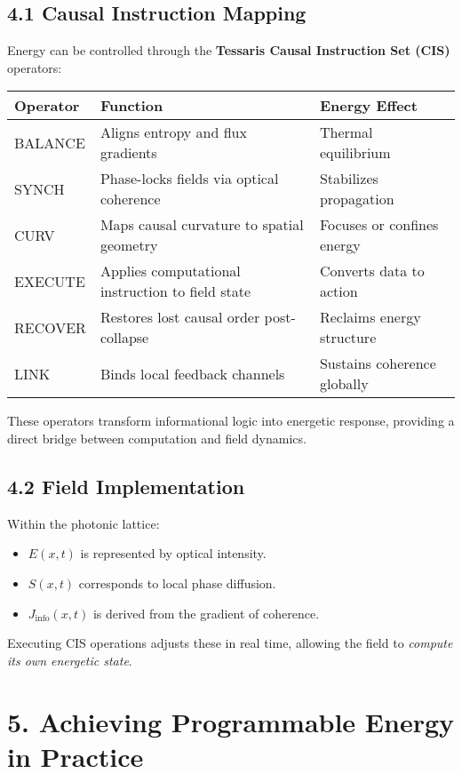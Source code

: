 \documentclass[11pt,a4paper]{article}
\begin{document}
\subsection*{4.1 Causal Instruction Mapping}
Energy can be controlled through the \textbf{Tessaris Causal Instruction Set (CIS)} operators:
\begin{center}
\begin{tabular}{|l|l|l|}
\hline
\textbf{Operator} & \textbf{Function} & \textbf{Energy Effect} \\
\hline
BALANCE & Aligns entropy and flux gradients & Thermal equilibrium \\
SYNCH & Phase-locks fields via optical coherence & Stabilizes propagation \\
CURV & Maps causal curvature to spatial geometry & Focuses or confines energy \\
EXECUTE & Applies computational instruction to field state & Converts data to action \\
RECOVER & Restores lost causal order post-collapse & Reclaims energy structure \\
LINK & Binds local feedback channels & Sustains coherence globally \\
\hline
\end{tabular}
\end{center}

These operators transform informational logic into energetic response, providing a direct bridge between computation and field dynamics.

\subsection*{4.2 Field Implementation}
Within the photonic lattice:
\begin{itemize}
  \item $E(x,t)$ is represented by optical intensity.
  \item $S(x,t)$ corresponds to local phase diffusion.
  \item $J_{\text{info}}(x,t)$ is derived from the gradient of coherence.
\end{itemize}
Executing CIS operations adjusts these in real time, allowing the field to \emph{compute its own energetic state}.

\section{5. Achieving Programmable Energy in Practice}
\end{document}
